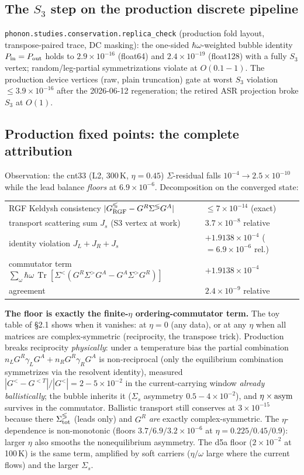 \documentclass[11pt]{article}
\newcommand{\Tr}{\operatorname{Tr}}
\begin{document}
\subsection{The $S_3$ step on the production discrete pipeline}
\texttt{phonon.studies.conservation.replica\_check} (production fold
layout, transpose-paired trace, DC masking): the one-sided
$\hbar\omega$-weighted bubble identity $P_{\rm in}=P_{\rm out}$ holds to
$2.9\times10^{-16}$ (float64) and $2.4\times10^{-19}$ (float128) with a
fully $S_3$ vertex; random/leg-partial symmetrizations violate at
$O(0.1\!-\!1)$. The production device vertices (raw, plain truncation)
gate at worst $S_3$ violation $\le 3.9\times10^{-16}$ after the 2026-06-12
regeneration; the retired ASR projection broke $S_3$ at $O(1)$.

\subsection{Production fixed points: the complete attribution}
Observation: the cnt33 (L2, 300\,K, $\eta=0.45$) $\Sigma$-residual falls
$10^{-4}\!\to\!2.5\times10^{-10}$ while the lead balance \emph{floors}
at $6.9\times10^{-6}$. Decomposition on the converged state:
\begin{center}\begin{tabular}{ll}
\toprule
RGF Keldysh consistency $|G^{\lessgtr}_{\rm RGF}-G^R\Sigma^{\lessgtr}G^A|$
  & $\le 7\times10^{-14}$ (exact)\\
transport scattering sum $J_s$ (S3 vertex at work)
  & $3.7\times10^{-8}$ relative\\
identity violation $J_L+J_R+J_s$ & $+1.9138\times10^{-4}$
  ($=6.9\times10^{-6}$ rel.)\\
commutator term $\sum_\omega \hbar\omega\,
  \Tr[\Sigma^<(G^R\Sigma^>G^A-G^A\Sigma^>G^R)]$
  & $+1.9138\times10^{-4}$\\
agreement & $2.4\times10^{-9}$ relative\\
\bottomrule
\end{tabular}\end{center}

\textbf{The floor is exactly the finite-$\eta$ ordering-commutator term.}
The toy table of \S2.1 shows when it vanishes: at $\eta=0$ (any data), or
at any $\eta$ when all matrices are complex-symmetric (reciprocity, the
transpose trick). Production breaks reciprocity \emph{physically}: under a
temperature bias the partial combination
$n_LG^R\gamma_LG^A+n_RG^R\gamma_RG^A$ is non-reciprocal (only the
equilibrium combination symmetrizes via the resolvent identity), measured
$|G^<-G^{<T}|/|G^<|=2\!-\!5\times10^{-2}$ in the current-carrying window
\emph{already ballistically}; the bubble inherits it
($\Sigma_s$ asymmetry $0.5\!-\!4\times10^{-2}$), and
$\eta\times{\rm asym}$ survives in the commutator. Ballistic transport
still conserves at $3\times10^{-15}$ because there
$\Sigma^{\lessgtr}_{\rm tot}$ (leads only) and $G^R$ \emph{are} exactly
complex-symmetric. The $\eta$-dependence is non-monotonic (floors
$3.7/6.9/3.2\times10^{-6}$ at $\eta=0.225/0.45/0.9$): larger $\eta$ also
smooths the nonequilibrium asymmetry. The d5a floor
($2\times10^{-2}$ at 100\,K) is the same term, amplified by soft
carriers ($\eta/\omega$ large where the current flows) and the larger
$\Sigma_s$.
\end{document}

